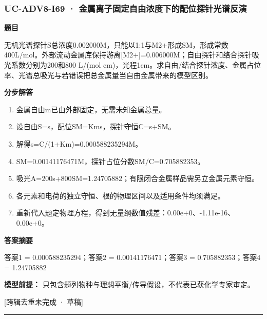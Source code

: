 \documentclass[UTF8,11pt,a4paper]{ctexart}
\begin{document}
\subsubsection*{UC-ADV8-I69 · 金属离子固定自由浓度下的配位探针光谱反演}
\noindent\textbf{题目}\par
无机光谱探针S总浓度0.002000M，只能以1:1与M2+形成SM，形成常数400L/mol。外部流动金属库保持游离[M2+]=0.006000M；自由探针和络合探针吸光系数分别为200和800 L/(mol cm)，光程1cm。求自由/结合探针浓度、金属占位率、光谱总吸光与若错误把总金属量当自由金属带来的模型区别。\par
\medskip\noindent\textbf{分步解答}
\begin{enumerate}
\item 金属自由m已由外部固定，无需未知金属总量。
\item 设自由S=s，配位SM=Kms，探针守恒C=s+SM。
\item 解得s=C/(1+Km)=0.000588235294M。
\item SM=0.00141176471M，探针占位分数SM/C=0.705882353。
\item 吸光A=200s+800SM=1.24705882；有限闭合金属样品需另立金属元素守恒。
\item 各元素和电荷的独立守恒、根的物理区间以及适用条件均须满足。
\item 重新代入题定物理方程，得到无量纲数值残差：0.00e+0、-1.11e-16、0.00e+0。
\end{enumerate}
\noindent\textbf{答案摘要}\par
答案1 = 0.000588235294；答案2 = 0.00141176471；答案3 = 0.705882353；答案4 = 1.24705882\par
\noindent\textbf{模型前提：}
只包含题列物种与理想平衡/传导假设，不代表已获化学专家审定。\par
\noindent\textcolor{red!65!black}{[跨辑去重未完成 · 草稿]} \par
\medskip\hrule\medskip
{}
\end{document}
